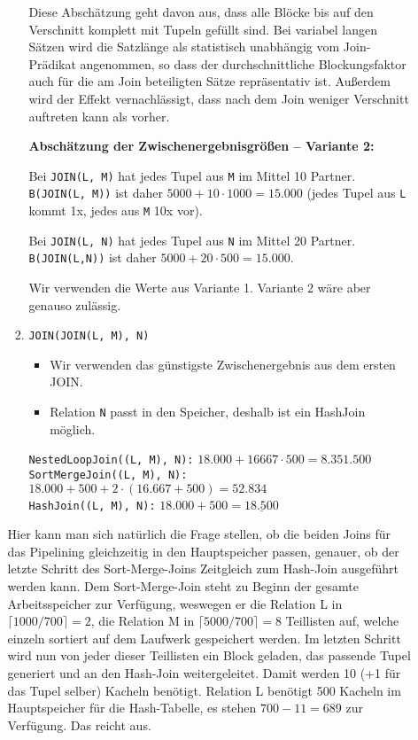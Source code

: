 \begin{enumerate}[a)]
\begin{enumerate}[i)]
\begin{solution}
\begin{enumerate}[1.]
			  Diese Abschätzung geht davon aus, dass alle Blöcke bis auf den Verschnitt komplett mit Tupeln gefüllt sind.
			  Bei variabel langen Sätzen wird die Satzlänge als statistisch unabhängig vom Join-Prädikat angenommen, so dass der durchschnittliche Blockungsfaktor auch für die am Join beteiligten Sätze repräsentativ ist.
			  Außerdem wird der Effekt vernachlässigt, dass nach dem Join weniger Verschnitt auftreten kann als vorher.

			  \textbf{Abschätzung der Zwischenergebnisgrößen -- Variante 2:}

			  Bei \texttt{JOIN(L, M)} hat jedes Tupel aus \texttt{M} im Mittel 10 Partner.
			  \texttt{B(JOIN(L, M))} ist daher $5000+10 \cdot 1000 = 15.000$ (jedes Tupel aus \texttt{L} kommt 1x, jedes aus \texttt{M} 10x vor).

			  Bei \texttt{JOIN(L, N)} hat jedes Tupel aus \texttt{N} im Mittel 20 Partner.
			  \texttt{B(JOIN(L,N))} ist daher $5000+20 \cdot 500 = 15.000$.

			  Wir verwenden die Werte aus Variante 1.
			  Variante 2 wäre aber genauso zulässig.

			\item \texttt{JOIN(JOIN(L, M), N)}
			  \begin{itemize}
				  \item Wir verwenden das günstigste Zwischenergebnis aus dem ersten JOIN.
				  \item Relation \texttt{N} passt in den Speicher, deshalb ist ein HashJoin möglich.
			  \end{itemize}

			  \texttt{NestedLoopJoin((L, M), N):} $18.000 + 16667 \cdot 500 = 8.351.500$ \\
			  \texttt{SortMergeJoin((L, M), N):} $18.000 + 500 + 2 \cdot (16.667 + 500) = 52.834$ \\
			  \texttt{HashJoin((L, M), N):} $18.000 + 500 = \underline{18.500}$ \\

		\end{enumerate}

		Hier kann man sich natürlich die Frage stellen, ob die beiden Joins für das Pipelining gleichzeitig in den Hauptspeicher passen, genauer, ob der letzte Schritt des Sort-Merge-Joins Zeitgleich zum Hash-Join ausgeführt werden kann.
		Dem Sort-Merge-Join steht zu Beginn der gesamte Arbeitsspeicher zur Verfügung, weswegen er die Relation L in $\lceil 1000/700\rceil = 2$, die Relation M in $\lceil 5000 / 700 \rceil = 8$ Teillisten auf, welche einzeln sortiert auf dem Laufwerk gespeichert werden.
		Im letzten Schritt wird nun von jeder dieser Teillisten ein Block geladen, das passende Tupel generiert und an den Hash-Join weitergeleitet.
		Damit werden 10 (+1 für das Tupel selber) Kacheln benötigt.
		Relation L benötigt 500 Kacheln im Hauptspeicher für die Hash-Tabelle, es stehen $700-11=689$ zur Verfügung.
		Das reicht aus.


\end{solution}
\end{enumerate}
\end{enumerate}
